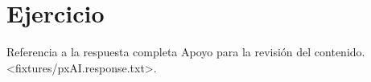 \documentclass[ES,AI,ANX,no-cover,no-toc]{P3CTeX}
\begin{document}
\section{Ejercicio}
Referencia a la respuesta completa 
  {Apoyo para la revisión del contenido.}
  <fixtures/pxAI.response.txt>.
\end{document}
